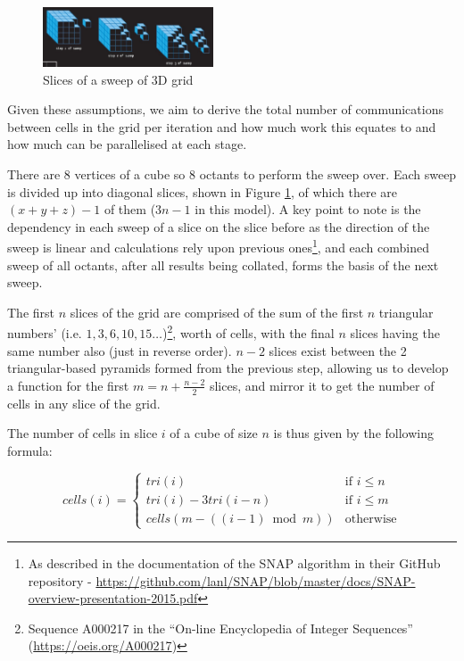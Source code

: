 \documentclass[conference]{IEEEtran}
\begin{document}
\begin{figure}[h!]
\centering
\includegraphics[width=0.45\textwidth]{images/Sweep.jpg}
\caption{Slices of a sweep of 3D grid}
\label{fig:3dsweepslice}
\end{figure}

Given these assumptions, we aim to derive the total number of communications between cells in the grid per iteration and how much work this equates to and how much can be parallelised at each stage.

There are $ 8 $ vertices of a cube so $ 8 $ octants to perform the sweep over. Each sweep is divided up into diagonal slices, shown in Figure \ref{fig:3dsweepslice}, of which there are $ (x + y + z) - 1 $ of them ($ 3n - 1 $ in this model). A key point to note is the dependency in each sweep of a slice on the slice before as the direction of the sweep is linear and calculations rely upon previous ones\footnote{As described in the documentation of the SNAP algorithm in their GitHub repository - \url{ https://github.com/lanl/SNAP/blob/master/docs/SNAP-overview-presentation-2015.pdf}}, and each combined sweep of all octants, after all results being collated, forms the basis of the next sweep.

The first $ n $ slices of the grid are comprised of the sum of the first $ n $ triangular numbers’ (i.e. $ 1, 3, 6, 10, 15\dots $)\footnote{Sequence A000217 in the ``On-line Encyclopedia of Integer Sequences'' (\url{https://oeis.org/A000217})}, worth of cells, with the final $ n $ slices having the same number also (just in reverse order). $ n - 2 $ slices exist between the 2 triangular-based pyramids formed from the previous step, allowing us to develop a function for the first $ m = n + \frac{n - 2}{2} $ slices, and mirror it to get the number of cells in any slice of the grid.

The number of cells in slice $ i $ of a cube of size $ n $ is thus given by the following formula:

\begin{equation}
cells(i) = \left\{
	\begin{array}{ll}
		tri(i) & \mbox{if } i \le n \\
		tri(i) - 3tri(i - n) & \mbox{if } i \le m \\
		cells(m - ((i - 1)\bmod m)) & \mbox{otherwise}
	\end{array}
\right.
\end{equation}
\end{document}

